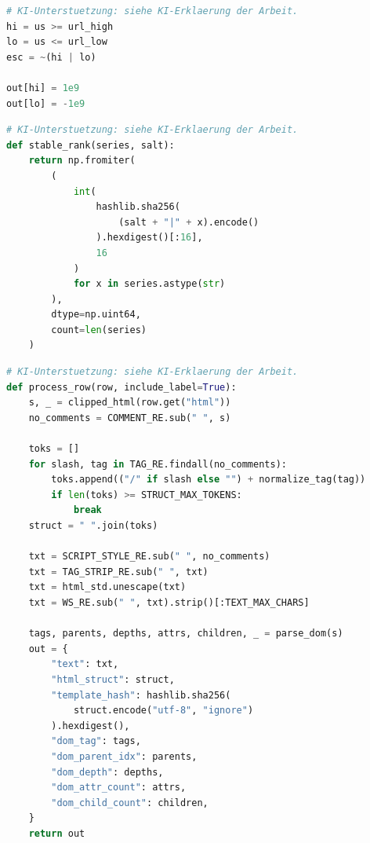 \par\medskip\noindent\begin{minipage}{\dimexpr\linewidth-1em\relax}
\begin{lstlisting}[language=Python,caption={Routingentscheidung der URL-first-Kaskade -- gekürzter zusammenhängender Originalauszug},label={lst:cascade_route}]
# KI-Unterstuetzung: siehe KI-Erklaerung der Arbeit.
hi = us >= url_high
lo = us <= url_low
esc = ~(hi | lo)

out[hi] = 1e9
out[lo] = -1e9
\end{lstlisting}
\end{minipage}\par\medskip

\par\medskip\noindent\begin{minipage}{\dimexpr\linewidth-1em\relax}
\begin{lstlisting}[language=Python,caption={Deterministische Rangbildung für die Datenpartitionierung},label={lst:stable_rank}]
# KI-Unterstuetzung: siehe KI-Erklaerung der Arbeit.
def stable_rank(series, salt):
    return np.fromiter(
        (
            int(
                hashlib.sha256(
                    (salt + "|" + x).encode()
                ).hexdigest()[:16],
                16
            )
            for x in series.astype(str)
        ),
        dtype=np.uint64,
        count=len(series)
    )
\end{lstlisting}
\end{minipage}\par\medskip

\par\medskip\noindent\begin{minipage}{\dimexpr\linewidth-1em\relax}
\begin{lstlisting}[language=Python,caption={Aufbereitung von HTML-Text und strukturellen Webseiteninformationen -- gekürzter Originalausschnitt},label={lst:process_row}]
# KI-Unterstuetzung: siehe KI-Erklaerung der Arbeit.
def process_row(row, include_label=True):
    s, _ = clipped_html(row.get("html"))
    no_comments = COMMENT_RE.sub(" ", s)

    toks = []
    for slash, tag in TAG_RE.findall(no_comments):
        toks.append(("/" if slash else "") + normalize_tag(tag))
        if len(toks) >= STRUCT_MAX_TOKENS:
            break
    struct = " ".join(toks)

    txt = SCRIPT_STYLE_RE.sub(" ", no_comments)
    txt = TAG_STRIP_RE.sub(" ", txt)
    txt = html_std.unescape(txt)
    txt = WS_RE.sub(" ", txt).strip()[:TEXT_MAX_CHARS]

    tags, parents, depths, attrs, children, _ = parse_dom(s)
    out = {
        "text": txt,
        "html_struct": struct,
        "template_hash": hashlib.sha256(
            struct.encode("utf-8", "ignore")
        ).hexdigest(),
        "dom_tag": tags,
        "dom_parent_idx": parents,
        "dom_depth": depths,
        "dom_attr_count": attrs,
        "dom_child_count": children,
    }
    return out
\end{lstlisting}
\end{minipage}\par\medskip

